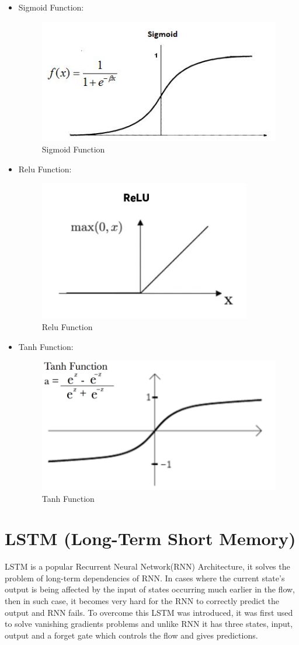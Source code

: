 \documentclass[oneside,12pt]{Classes/RoboticsLaTeX}
\begin{document}
\begin{itemize}
  \item Sigmoid Function:
  \begin{figure}[H]
    \centering
    \includegraphics[width=0.5\linewidth]{Figures/sigmoid.png}
    \caption{Sigmoid Function}
    \label{fig:sigmoid}
  \end{figure}

  \item Relu Function:
  \begin{figure}[H]
    \centering
    \includegraphics[width=0.5\linewidth]{Figures/relu.png}
    \caption{Relu Function}
    \label{fig:relu}
  \end{figure}

  \item Tanh Function:
  \begin{figure}[H]
    \centering
    \includegraphics[width=0.5\linewidth]{Figures/tanh.png}
    \caption{Tanh Function}
    \label{fig:tanh}
  \end{figure}
\end{itemize}

\section{LSTM (Long-Term Short Memory)}
LSTM is a popular Recurrent Neural Network(RNN) Architecture, it solves the problem of long-term dependencies of RNN. In cases where the current state's output is being affected by the input of states occurring much earlier in the flow, then in such case, it becomes very hard for the RNN to correctly predict the output and RNN fails. To overcome this LSTM was introduced, it was first used to solve vanishing gradients problems and unlike RNN it has three states, input, output and a forget gate which controls the flow and gives predictions.
\end{document}
